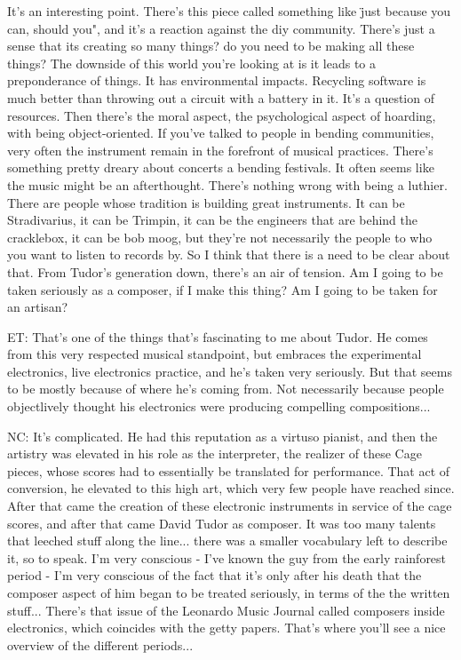 It's an interesting point. There's this piece called something like \"just because you can, should you", and it's a reaction against the diy community. There's just a sense that its creating so many things? do you need to be making all these things? The downside of this world you're looking at is it leads to a preponderance of things. It has environmental impacts. Recycling software is much better than throwing out a circuit with a battery in it. It's a question of resources. Then there's the moral aspect, the psychological aspect of hoarding, with being object-oriented. If you've talked to people in bending communities, very often the instrument remain in the forefront of musical practices. There's something pretty dreary about concerts a bending festivals. It often seems like the music might be an afterthought. There's nothing wrong with being a luthier. There are people whose tradition is building great instruments. It can be Stradivarius, it can be Trimpin, it can be the engineers that are behind the cracklebox, it can be bob moog, but they're not necessarily the people to who you want to listen to records by. So I think that there is a need to be clear about that. From Tudor's generation down, there's an air of tension. Am I going to be taken seriously as a composer, if I make this thing? Am I going to be taken for an artisan? 

ET: That's one of the things that's fascinating to me about Tudor. He comes from this very respected musical standpoint, but embraces the experimental electronics, live electronics practice, and he's taken very seriously. But that seems to be mostly because of where he's coming from. Not necessarily because people objectlively thought his electronics were producing compelling compositions... 

NC: It's complicated. He had this reputation as a virtuso pianist, and then the artistry was elevated in his role as the interpreter, the realizer of these Cage pieces, whose scores had to essentially be translated for performance. That act of conversion, he elevated to this high art, which very few people have reached since. After that came the creation of these electronic instruments in service of the cage scores, and after that came David Tudor as composer. It was too many talents that leeched stuff along the line... there was a smaller vocabulary left to describe it, so to speak. I'm very conscious - I've known the guy from the early rainforest period - I'm very conscious of the fact that it's only after his death that the composer aspect of him began to be treated seriously, in terms of the the written stuff... There's that issue of the Leonardo Music Journal called composers inside electronics, which coincides with the getty papers. That's where you'll see a nice overview of the different periods... 

